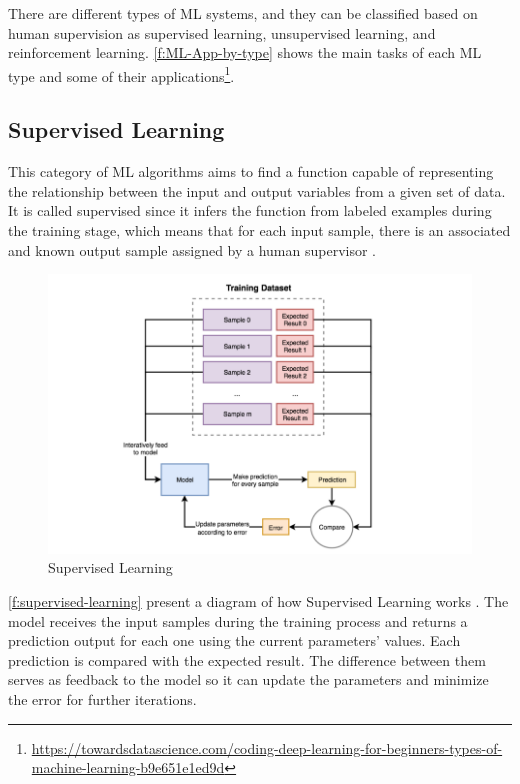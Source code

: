 There are different types of \ac{ML} systems, and they can be classified based on human supervision as supervised learning, unsupervised learning, and reinforcement learning. \autoref{f:ML-App-by-type} shows the main tasks of each \ac{ML} type and some of their applications\footnote{\url{https://towardsdatascience.com/coding-deep-learning-for-beginners-types-of-machine-learning-b9e651e1ed9d}}.

\subsection{Supervised Learning}
This category of \ac{ML} algorithms aims to find a function capable of representing the relationship between the input and output variables from a given set of data. It is called supervised since it infers the function from labeled examples during the training stage, which means that for each input sample, there is an associated and known output sample assigned by a human supervisor \cite{Batta2020}.

\begin{figure}[h]
\centering
\includegraphics[width=\linewidth]{figures/Ch2/Supervised-Learning.png}
\caption{Supervised Learning}
\label{f:supervised-learning}
\end{figure}

\autoref{f:supervised-learning} present a diagram of how Supervised Learning works%
. The model receives the input samples during the training process and returns a prediction output for each one using the current parameters' values. Each prediction is compared with the expected result. The difference between them serves as feedback to the model so it can update the parameters and minimize the error for further iterations.

